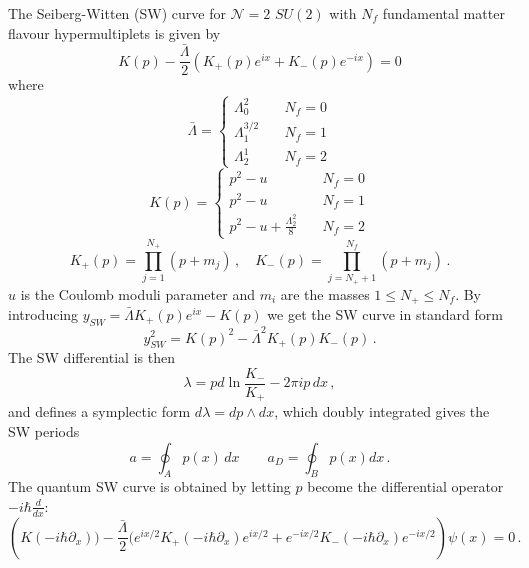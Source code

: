 \documentclass[11pt,a4paper]{elsarticle}
\newcommand{\be}{\begin{equation}}
\newcommand{\ee}{\end{equation}}
\numberwithin{figure}{section}
\numberwithin{table}{section}
\begin{document}
The Seiberg-Witten (SW) curve for $\mathcal{N}=2$ $SU(2)$ with $N_f$ fundamental matter flavour hypermultiplets is given by
\be 
K(p) - \frac{\bar{\Lambda}}{2} (K_+(p) e^{i x} + K_-(p) e^{- i x} ) = 0
\ee
where
\be 
\bar{\Lambda} = \begin{cases}
\Lambda_0^2   \quad &N_f = 0\\
\Lambda_1^{3/2}  \quad &N_f = 1\\
\Lambda_2^1 \quad &N_f = 2%
\end{cases}
\ee 
\be 
K(p) = \begin{cases}
p^2-u   \quad &N_f = 0\\
p^2-u  \quad &N_f = 1\\
p^2-u + \frac{\Lambda_2^2}{8}\quad &N_f = 2 %
\end{cases}
\ee 
\be 
K_+(p) = \prod_{j=1}^{N_+} (p + m_j) \,, \quad K_-(p) = \prod_{j=N_++1}^{N_f} (p + m_j) \,.
\ee 
$u$ is the Coulomb moduli parameter and $m_i$ are the masses $1\leq N_+\leq N_f$. By introducing $y_{SW}= \bar{\Lambda} K_+ (p) e^{i x} - K(p)$ we get the SW curve in standard form 
\be \label{SWcurve4}
y^2_{SW} = K(p)^2 -\bar{\Lambda}^2 K_+(p) K_-(p)\,.
\ee
The SW differential is then 
\be 
\lambda = p d \ln \frac{K_-}{K_+} - 2 \pi i p \, d x\,,
\ee 
and defines a symplectic form $d \lambda = d p \wedge d x$, which doubly integrated gives the SW periods~\cite{ItoKannoOkubo:2017}
\be 
a = \oint_A p(x) \, dx \qquad a_D = \oint_B p(x) dx\,.
\ee 
The quantum SW curve is obtained by letting $p$ become the differential operator $- i \hbar \frac{d}{dx}$\cite{ItoKannoOkubo:2017}:
\be  \label{genqswode}
\left( K(- i \hbar \partial_x)) -\frac{\bar{\Lambda}}{2} ( e^{i x/2} K_+ (- i \hbar \partial_x ) e^{i x/2} + e^{-i x/2} K_- (- i \hbar \partial_x ) e^{-i x/2} \right) \psi(x) = 0\,.
\ee 
\end{document}
